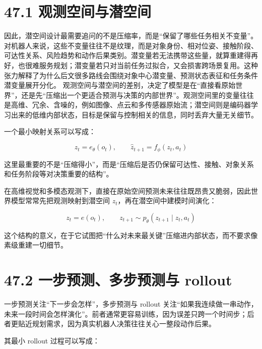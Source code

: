 \section*{47.1 观测空间与潜空间}


因此，潜空间设计最需要追问的不是压缩率，而是“保留了哪些任务相关不变量”。对机器人来说，这些不变量往往不是纹理，而是对象身份、相对位姿、接触阶段、可达性关系、风险趋势和动作后果类别。潜变量若无法携带这些量，就算重建得再好，也很难服务规划；潜变量若只对当前任务过拟合，又会损害跨场景复用。这种张力解释了为什么后文很多路线会围绕对象中心潜变量、预测状态表征和任务条件潜变量展开分化。 观测空间与潜空间的差别，决定了模型是在“直接看原始世界”，还是先“压缩出一个更适合预测与决策的内部世界”。观测空间里的变量往往是高维、冗余、含噪的，例如图像、点云和多传感器原始流；潜空间则是编码器学习出来的低维内部状态，目标是保留与控制相关的信息，同时丢弃大量无关细节。

一个最小映射关系可以写成：

\begingroup
\footnotesize
\begin{equation*}
z_t = e_\theta(o_t), \qquad \hat{z}_{t+1} = f_\phi(z_t, a_t)
\end{equation*}
\endgroup

这里最重要的不是“压缩得小”，而是“压缩后是否仍保留可达性、接触、对象关系和任务阶段等对决策重要的结构”。

在高维视觉和多模态观测下，直接在原始空间预测未来往往既昂贵又脆弱，因此世界模型常常先把观测映射到潜空间 \(z_t\)，再在潜空间中建模时间演化：

\begingroup
\footnotesize
\begin{equation*}
z_t = e(o_t), \qquad z_{t+1} \sim p_{\theta}(z_{t+1}\mid z_t, a_t)
\end{equation*}
\endgroup

这个结构的意义，在于它试图把“什么对未来最关键”压缩进内部状态，而不要求像素级重建一切细节。

\section*{47.2 一步预测、多步预测与 rollout}


一步预测关注“下一步会怎样”，多步预测与 rollout 关注“如果我连续做一串动作，未来一段时间会怎样演化”。前者通常更容易训练，因为误差只跨一个时间步；后者更贴近规划需求，因为真实机器人决策往往关心一整段动作后果。

其最小 rollout 过程可以写成：

